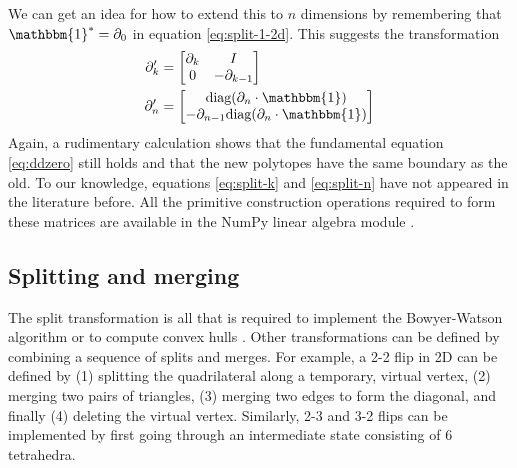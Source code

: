 \documentclass[twocolumn]{article}
\begin{document}
We can get an idea for how to extend this to $n$ dimensions by remembering that $\mathbbm{1}^* = \partial_0$ in equation \eqref{eq:split-1-2d}.
This suggests the transformation
\begin{align}
    \partial_k' & = \left[\begin{matrix}\partial_k & I \\ 0 & -\partial_{k - 1}\end{matrix}\right] \label{eq:split-k} \\
    \partial_n' & = \left[\begin{matrix}\text{diag}(\partial_n\cdot\mathbbm{1}) \\ -\partial_{n - 1}\text{diag}(\partial_n\cdot\mathbbm{1})\end{matrix}\right] \label{eq:split-n}
\end{align}
Again, a rudimentary calculation shows that the fundamental equation \eqref{eq:ddzero} still holds and that the new polytopes have the same boundary as the old.
To our knowledge, equations \eqref{eq:split-k} and \eqref{eq:split-n} have not appeared in the literature before.
All the primitive construction operations required to form these matrices are available in the NumPy linear algebra module \cite{harris2020array}.

\subsection{Splitting and merging}

The split transformation is all that is required to implement the Bowyer-Watson algorithm \cite{bowyer1981computing, watson1981computing} or to compute convex hulls \cite{berg1997computational}.
Other transformations can be defined by combining a sequence of splits and merges.
For example, a 2-2 flip in 2D can be defined by (1) splitting the quadrilateral along a temporary, virtual vertex, (2) merging two pairs of triangles, (3) merging two edges to form the diagonal, and finally (4) deleting the virtual vertex.
Similarly, 2-3 and 3-2 flips can be implemented by first going through an intermediate state consisting of 6 tetrahedra.
\end{document}
